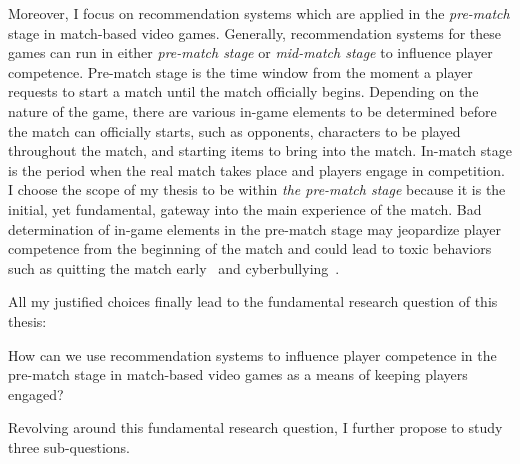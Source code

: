 Moreover, I focus on recommendation systems which are applied in the \textit{pre-match} stage in match-based video games. Generally, recommendation systems for these games can run in either \textit{pre-match stage} or \textit{mid-match stage} to influence player competence. Pre-match stage is the time window from the moment a player requests to start a match until the match officially begins. Depending on the nature of the game, there are various in-game elements to be determined before the match can officially starts, such as opponents, characters to be played throughout the match, and starting items to bring into the match. In-match stage is the period when the real match takes place and players engage in competition. I choose the scope of my thesis to be within \textit{the pre-match stage} because it is the initial, yet fundamental, gateway into the main experience of the match. Bad determination of in-game elements in the pre-match stage may jeopardize player competence from the beginning of the match and could lead to toxic behaviors such as quitting the match early~\cite{shores2014identification} and cyberbullying~\cite{kwak2015exploring}. 

All my justified choices finally lead to the fundamental research question of this thesis:

\begin{displayquote}
How can we use recommendation systems to influence player competence in the pre-match stage in match-based video games as a means of keeping players engaged?
\end{displayquote}

Revolving around this fundamental research question, I further propose to study three sub-questions. 


